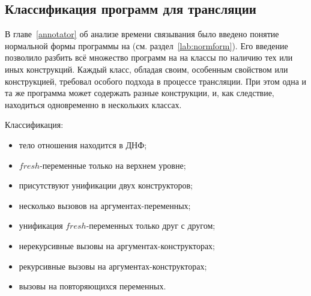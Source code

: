 \subsection{Классификация программ для трансляции}
\label{lab:classif}

В главе~\ref{annotator} об анализе времени связывания было введено понятие нормальной формы программы на \miniKanren{} (см. раздел~\ref{lab:normform}).
Его введение позволило разбить всё множество программ на \miniKanren{} на классы по наличию тех или иных конструкций.
Каждый класс, обладая своим, особенным свойством или конструкцией, требовал особого подхода в процессе трансляции.
При этом одна и та же программа может содержать разные конструкции, и, как следствие, находиться одновременно в нескольких классах.

Классификация:
\begin{itemize}
    \item тело отношения находится в ДНФ;
    \item $fresh$-переменные только на верхнем уровне;
    \item присутствуют унификации двух конструкторов;
    \item несколько вызовов на аргументах-переменных;
    \item унификация $fresh$-переменных только друг с другом;
    \item нерекурсивные вызовы на аргументах-конструкторах;
    \item рекурсивные вызовы на аргументах-конструкторах;
    \item вызовы на повторяющихся переменных.
\end{itemize}
